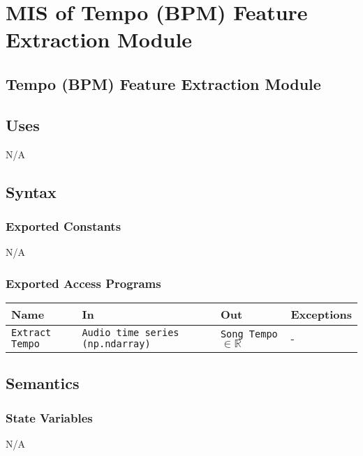 \documentclass[12pt, titlepage]{article}
\begin{document}
\section{MIS of Tempo (BPM) Feature Extraction Module} 

\subsection{Tempo (BPM) Feature Extraction Module}

\subsection{Uses}
N/A

\subsection{Syntax}

\subsubsection{Exported Constants}
N/A

\subsubsection{Exported Access Programs}

\begin{center}
\begin{tabular}{p{2cm} p{4cm} p{4cm} p{2cm}}
\hline
\textbf{Name} & \textbf{In} & \textbf{Out} & \textbf{Exceptions}\\
\hline%
\texttt{Extract Tempo} &\texttt{Audio time series (np.ndarray)} &\texttt{Song Tempo} $\in \mathbb{R}$ &- \\
\hline
\end{tabular}
\end{center}

\subsection{Semantics}

\subsubsection{State Variables}
N/A
\end{document}
